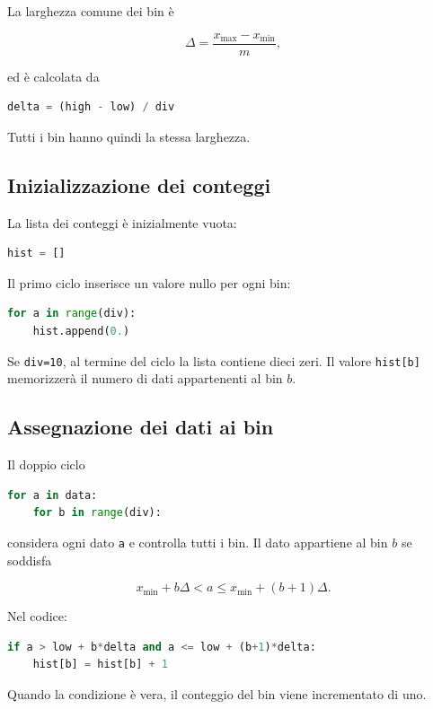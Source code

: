 La larghezza comune dei bin è

\[
\Delta = \frac{x_{\max}-x_{\min}}{m},
\]

ed è calcolata da

\begin{lstlisting}[language=Python]
delta = (high - low) / div
\end{lstlisting}

Tutti i bin hanno quindi la stessa larghezza.

\subsection{Inizializzazione dei conteggi}

La lista dei conteggi è inizialmente vuota:

\begin{lstlisting}[language=Python]
hist = []
\end{lstlisting}

Il primo ciclo inserisce un valore nullo per ogni bin:

\begin{lstlisting}[language=Python]
for a in range(div):
    hist.append(0.)
\end{lstlisting}

Se \texttt{div=10}, al termine del ciclo la lista contiene dieci zeri.
Il valore \texttt{hist[b]} memorizzerà il numero di dati appartenenti al
bin $b$.

\subsection{Assegnazione dei dati ai bin}

Il doppio ciclo

\begin{lstlisting}[language=Python]
for a in data:
    for b in range(div):
\end{lstlisting}

considera ogni dato \texttt{a} e controlla tutti i bin. Il dato appartiene
al bin $b$ se soddisfa

\[
x_{\min}+b\Delta < a
\leq x_{\min}+(b+1)\Delta.
\]

Nel codice:

\begin{lstlisting}[language=Python]
if a > low + b*delta and a <= low + (b+1)*delta:
    hist[b] = hist[b] + 1
\end{lstlisting}

Quando la condizione è vera, il conteggio del bin viene incrementato di
uno.

